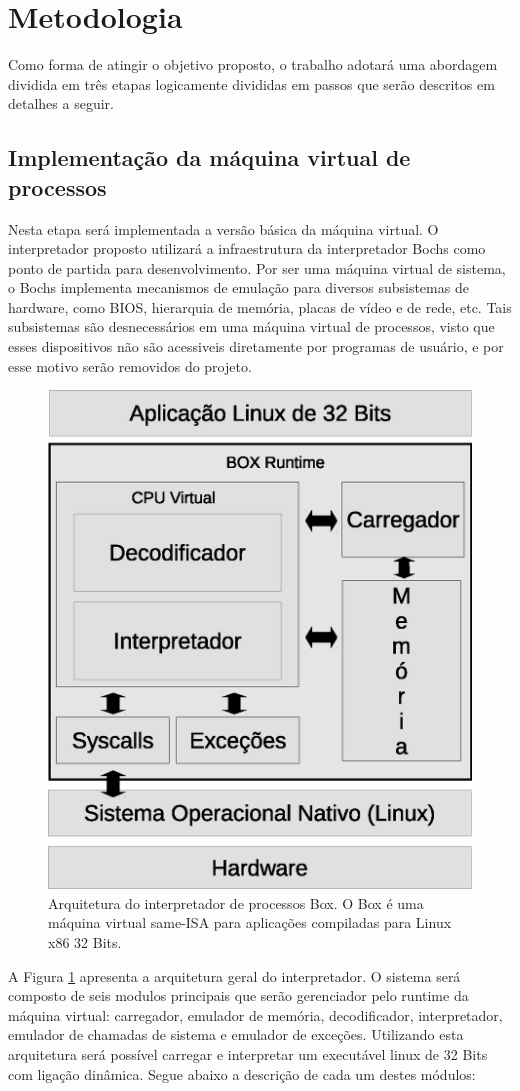 \documentclass[11pt,twoside]{article}
\begin{document}
\section{Metodologia}  \label{sec:metodologia}

Como forma de atingir o objetivo proposto, o trabalho adotará uma abordagem 
dividida em três etapas logicamente divididas em passos que serão descritos 
em detalhes a seguir.

\subsection{Implementação da máquina virtual de processos}

Nesta etapa será implementada a versão básica da máquina virtual. O 
interpretador proposto utilizará a infraestrutura da interpretador Bochs 
como ponto de partida para desenvolvimento. Por ser uma máquina virtual de 
sistema, o Bochs implementa mecanismos de emulação para diversos subsistemas 
de hardware, como BIOS, hierarquia de memória, placas de vídeo e de rede, etc. 
Tais subsistemas são desnecessários em uma máquina virtual de processos, visto 
que esses dispositivos não são acessiveis diretamente por programas de usuário, 
e por esse motivo serão removidos do projeto.

\begin{figure}[h]
 \centering
 \includegraphics[width=0.5\columnwidth]{./figures/box-architecture.eps}
 \caption{Arquitetura do interpretador de processos Box. 
 O Box é uma máquina virtual same-ISA para aplicações compiladas para Linux x86 32 Bits.}
 \label{fig:box-architecture}
\end{figure}

A Figura \ref{fig:box-architecture} apresenta a arquitetura geral do interpretador.
O sistema será composto de seis modulos principais que serão gerenciador pelo runtime
da máquina virtual: carregador, emulador de memória, decodificador, interpretador, 
emulador de chamadas de sistema e emulador de exceções. Utilizando esta arquitetura 
será possível carregar e interpretar um executável linux de 32 Bits com ligação dinâmica. 
Segue abaixo a descrição de cada um destes módulos:
\end{document}
